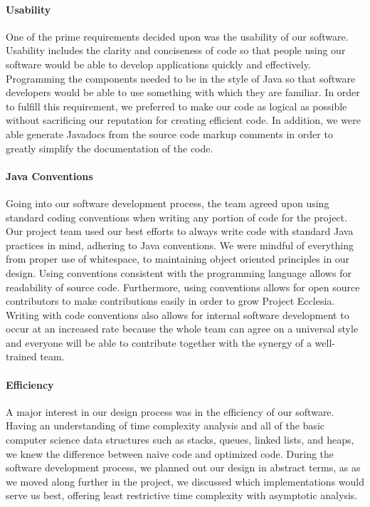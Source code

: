 \documentclass[letterpaper, 10pt]{article}
\begin{document}
		\paragraph{Usability}
		One of the prime requirements decided upon was the usability of our software. Usability includes the clarity and conciseness of code so that people using our software would be able to develop applications quickly and effectively. Programming the components needed to be in the style of Java so that software developers would be able to use something with which they are familiar. In order to fulfill this requirement, we preferred to make our code as logical as possible without sacrificing our reputation for creating efficient code. In addition, we were able generate Javadocs from the source code markup comments in order to greatly simplify the documentation of the code.
		
		\paragraph{Java Conventions}
		Going into our software development process, the team agreed upon using standard coding conventions when writing any portion of code for the project. Our project team used our best efforts to always write code with standard Java practices in mind, adhering to Java conventions. We were mindful of everything from proper use of whitespace, to maintaining object oriented principles in our design. Using conventions consistent with the programming language allows for readability of source code. Furthermore, using conventions allows for open source contributors to make contributions easily in order to grow Project Ecclesia. Writing with code conventions also allows for internal software development to occur at an increased rate because the whole team can agree on a universal style and everyone will be able to contribute together with the synergy of a well-trained team.
		
		\paragraph{Efficiency} 
		A major interest in our design process was in the efficiency of our software. Having an understanding of time complexity analysis and all of the basic computer science data structures such as stacks, queues, linked lists, and heaps, we knew the difference between naive code and optimized code. During the software development process, we planned out our design in abstract terms, as as we moved along further in the project, we discussed which implementations would serve us best, offering least restrictive time complexity with asymptotic analysis.
	
\end{document}
